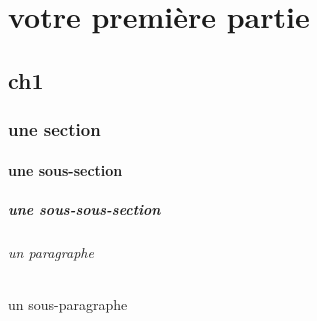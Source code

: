 \part{votre première partie}
\chapter{ch1} 
\section{une section}
\subsection{une sous-section}
\subsubsection{une sous-sous-section}
\paragraph{un paragraphe}
\subparagraph{un sous-paragraphe}